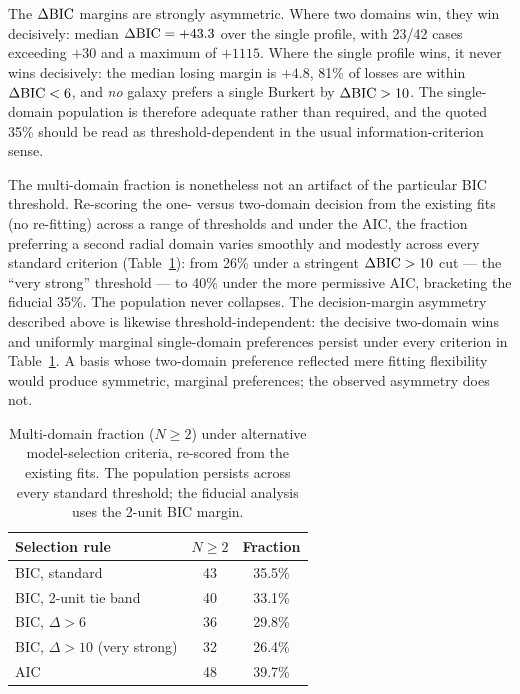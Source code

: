 \documentclass[twocolumn]{aastex701}
\newcommand{\dbic}{\Delta{\rm BIC}}
\begin{document}
The $\dbic$ margins are strongly asymmetric. Where two domains win, they win
decisively: median $\dbic = +43.3$ over the single profile, with 23/42 cases
exceeding $+30$ and a maximum of $+1115$. Where the single profile wins, it
never wins decisively: the median losing margin is $+4.8$, 81\% of losses are
within $\dbic < 6$, and \emph{no} galaxy prefers a single Burkert by
$\dbic > 10$. The single-domain population is therefore adequate rather than
required, and the quoted 35\% should be read as threshold-dependent in the
usual information-criterion sense.

The multi-domain fraction is nonetheless not an artifact of the particular BIC
threshold. Re-scoring the one- versus two-domain decision from the existing fits
(no re-fitting) across a range of thresholds and under the AIC, the fraction
preferring a second radial domain varies smoothly and modestly across every
standard criterion (Table~\ref{tab:sensitivity}): from 26\% under a stringent
$\dbic > 10$ cut --- the \citet{KassRaftery1995} ``very strong'' threshold ---
to 40\% under the more permissive AIC, bracketing the fiducial 35\%. The
population never collapses. The decision-margin asymmetry described above is
likewise threshold-independent: the decisive two-domain wins and uniformly
marginal single-domain preferences persist under every criterion in
Table~\ref{tab:sensitivity}. A basis whose two-domain preference reflected mere
fitting flexibility would produce symmetric, marginal preferences; the observed
asymmetry does not.

\begin{table}
\centering
\caption{Multi-domain fraction ($N \geq 2$) under alternative model-selection
criteria, re-scored from the existing fits. The population persists across every
standard threshold; the fiducial analysis uses the 2-unit BIC margin.}
\label{tab:sensitivity}
\begin{tabular}{lcc}
\hline
Selection rule & $N \geq 2$ & Fraction \\
\hline
BIC, standard              & 43 & 35.5\% \\
BIC, 2-unit tie band       & 40 & 33.1\% \\
BIC, $\Delta > 6$          & 36 & 29.8\% \\
BIC, $\Delta > 10$ (very strong) & 32 & 26.4\% \\
AIC                        & 48 & 39.7\% \\
\hline
\end{tabular}
\end{table}
\end{document}
